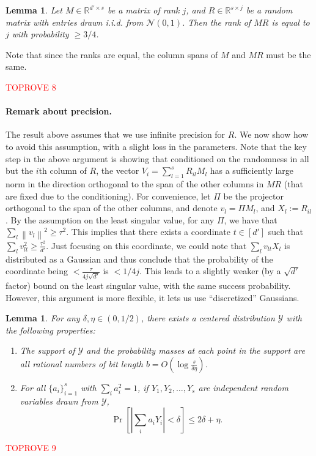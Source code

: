 \documentclass[11pt]{article}
\makeatletter
\newcommand{\norm}[1]{\left\lVert#1\right\rVert}
\theoremstyle{plain}
\newtheorem{lemma}[theorem]{Lemma}
\theoremstyle{plain}
\theoremstyle{definition}
\theoremstyle{plain}
\theoremstyle{remark}
\newenvironment{proof}[1][\protect\proofname]{\par
	\normalfont\topsep6\p@\@plus6\p@\relax
	\trivlist
	\itemindent\parindent
	\item[\hskip\labelsep\scshape #1]\ignorespaces
}{\endtrivlist\@endpefalse
}
\providecommand{\proofname}{Proof}
\newcommand{\RR}{\mathbb{R}}
\newcommand{\cY}{\mathcal{Y}}
\makeatother
\begin{document}
\begin{lemma}
\label{lem:rand_rotation}
    Let $M\in \RR^{d' \times s}$ be a matrix of rank $j$, and $R\in \RR^{s\times j}$ be a random matrix with entries drawn i.i.d. from $\mathcal{N}(0,1)$. Then the rank of $MR$ is equal to $j$ with probability $\ge 3/4$.
\end{lemma}
Note that since the ranks are equal, the column spans of $M$ and $MR$ must be the same.
\begin{proof}\textcolor{red}{TOPROVE 8}\end{proof}

\paragraph{Remark about precision.} The result above assumes that we use infinite precision for $R$. We now show how to avoid this assumption, with a slight loss in the parameters. 
Note that the key step in the above argument is showing that conditioned on the randomness in all but the $i$th column of $R$, the vector $V_i = \sum_{l=1}^s R_{il} M_l$ has a sufficiently large norm in the direction orthogonal to the span of the other columns in $MR$ (that are fixed due to the conditioning). For convenience, let $\Pi$ be the projector orthogonal to the span of the other columns, and denote $v_l = \Pi M_l$, and $X_{l} := R_{il}$. By the assumption on the least singular value, for any $\Pi$, we have that $\sum_l \norm{v_l}^2 \ge \tau^2$. This implies that there exists a coordinate $t \in [d']$ such that $\sum_l v_{lt}^2 \ge \frac{\tau^2}{d'}$. Just focusing on this coordinate, we could note that $\sum_l v_{lt} X_l$ is distributed as a Gaussian and thus conclude that the probability of the coordinate being $ < \frac{\tau}{4 j \sqrt{d'}}$ is $< 1/4j$. This leads to a slightly weaker (by a $\sqrt{d'}$ factor) bound on the least singular value, with the same success probability. However, this argument is more flexible, it lets us use ``discretized'' Gaussians.

\begin{lemma} For any $\delta, \eta \in (0, 1/2)$, there exists a centered distribution $\cY$ with the following properties:
\begin{enumerate}
\item The support of $\cY$ and the probability masses at each point in the support are all rational numbers of bit length $b = O(\log \frac{s}{\delta \eta} )$.
\item For all $\{a_i\}_{i=1}^s$ with $\sum_i a_i^2 = 1$, if $Y_1, Y_2, \dots, Y_s$ are independent random variables drawn from $\cY$, 
\[ \Pr[ |\sum_i a_i Y_i | < \delta ] \le 2\delta + \eta. \]
\end{enumerate}
\end{lemma} 
\begin{proof}\textcolor{red}{TOPROVE 9}\end{proof}
\end{document}
